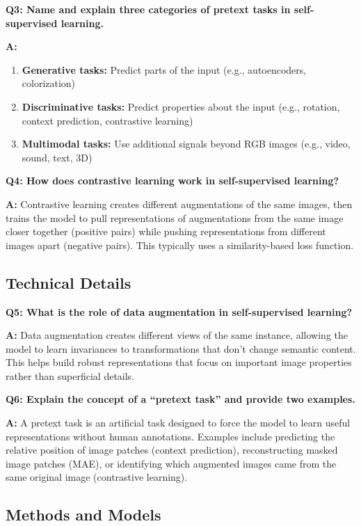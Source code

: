 \textbf{Q3: Name and explain three categories of pretext tasks in self-supervised learning.}

\textbf{A:}
\begin{enumerate}
    \item \textbf{Generative tasks:} Predict parts of the input (e.g., autoencoders, colorization)
    \item \textbf{Discriminative tasks:} Predict properties about the input (e.g., rotation, context prediction, contrastive learning)
    \item \textbf{Multimodal tasks:} Use additional signals beyond RGB images (e.g., video, sound, text, 3D)
\end{enumerate}

\textbf{Q4: How does contrastive learning work in self-supervised learning?}

\textbf{A:} Contrastive learning creates different augmentations of the same images, then trains the model to pull representations of augmentations from the same image closer together (positive pairs) while pushing representations from different images apart (negative pairs). This typically uses a similarity-based loss function.

\subsection*{Technical Details}

\textbf{Q5: What is the role of data augmentation in self-supervised learning?}

\textbf{A:} Data augmentation creates different views of the same instance, allowing the model to learn invariances to transformations that don't change semantic content. This helps build robust representations that focus on important image properties rather than superficial details.

\textbf{Q6: Explain the concept of a ``pretext task'' and provide two examples.}

\textbf{A:} A pretext task is an artificial task designed to force the model to learn useful representations without human annotations. Examples include predicting the relative position of image patches (context prediction), reconstructing masked image patches (MAE), or identifying which augmented images came from the same original image (contrastive learning).
\subsection*{Methods and Models}

